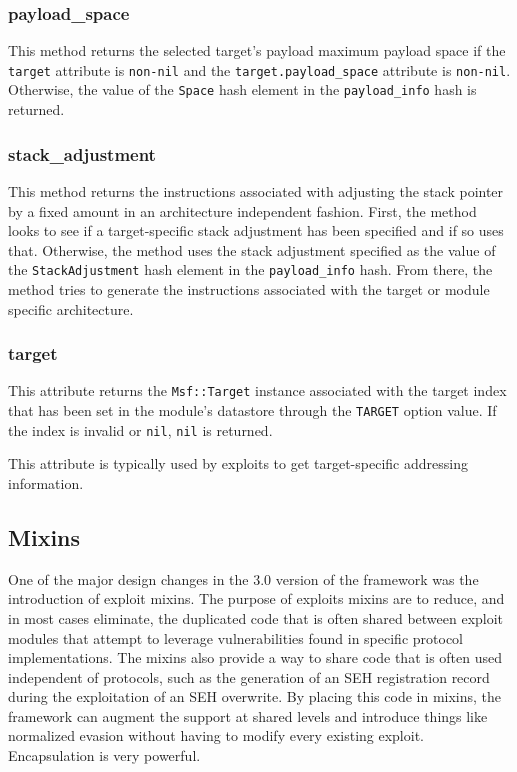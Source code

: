 \documentclass{report}
\begin{document}
            \subsubsection{payload\_space}

\par
This method returns the selected target's payload maximum payload
space if the \texttt{target} attribute is \texttt{non-nil} and the
\texttt{target.payload\_space} attribute is \texttt{non-nil}.
Otherwise, the value of the \texttt{Space} hash element in the
\texttt{payload\_info} hash is returned.

            \subsubsection{stack\_adjustment}

\par
This method returns the instructions associated with adjusting the
stack pointer by a fixed amount in an architecture independent
fashion.  First, the method looks to see if a target-specific stack
adjustment has been specified and if so uses that.  Otherwise, the
method uses the stack adjustment specified as the value of the
\texttt{StackAdjustment} hash element in the \texttt{payload\_info}
hash.  From there, the method tries to generate the instructions
associated with the target or module specific architecture.

            \subsubsection{target}

\par
This attribute returns the \texttt{Msf::Target} instance associated
with the target index that has been set in the module's datastore
through the \texttt{TARGET} option value.  If the index is invalid
or \texttt{nil}, \texttt{nil} is returned.

\par
This attribute is typically used by exploits to get target-specific
addressing information.

        \subsection{Mixins}

\par
One of the major design changes in the 3.0 version of the framework
was the introduction of exploit mixins.  The purpose of exploits
mixins are to reduce, and in most cases eliminate, the duplicated
code that is often shared between exploit modules that attempt to
leverage vulnerabilities found in specific protocol implementations.
The mixins also provide a way to share code that is often used
independent of protocols, such as the generation of an SEH
registration record during the exploitation of an SEH overwrite.  By
placing this code in mixins, the framework can augment the support
at shared levels and introduce things like normalized evasion
without having to modify every existing exploit.  Encapsulation is
very powerful.
\end{document}
